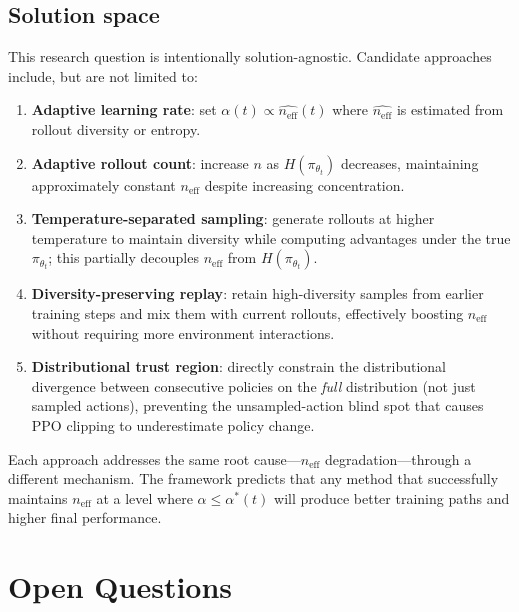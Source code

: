 \documentclass[11pt,a4paper]{article}
\newcommand{\neff}{n_{\mathrm{eff}}}
\newcommand{\pith}{\pi_{\theta_t}}
\newcommand{\alphaopt}{\alpha^*(t)}
\begin{document}
\subsection{Solution space}

This research question is intentionally solution-agnostic.
Candidate approaches include, but are not limited to:

\begin{enumerate}[noitemsep]
  \item \textbf{Adaptive learning rate}: set $\alpha(t) \propto \hat{\neff}(t)$
        where $\hat{\neff}$ is estimated from rollout diversity or entropy.
  \item \textbf{Adaptive rollout count}: increase $n$ as $H(\pith)$ decreases,
        maintaining approximately constant $\neff$ despite increasing concentration.
  \item \textbf{Temperature-separated sampling}: generate rollouts at higher temperature
        to maintain diversity while computing advantages under the true $\pith$;
        this partially decouples $\neff$ from $H(\pith)$.
  \item \textbf{Diversity-preserving replay}: retain high-diversity samples from
        earlier training steps and mix them with current rollouts,
        effectively boosting $\neff$ without requiring more environment interactions.
  \item \textbf{Distributional trust region}: directly constrain the distributional
        divergence between consecutive policies on the \emph{full} distribution
        (not just sampled actions), preventing the unsampled-action blind spot
        that causes PPO clipping to underestimate policy change.
\end{enumerate}

Each approach addresses the same root cause---$\neff$ degradation---through a different mechanism.
The framework predicts that any method that successfully maintains $\neff$ at a level
where $\alpha \leq \alphaopt$ will produce better training paths and higher final performance.

\section{Open Questions}
\label{sec:open}
\end{document}
